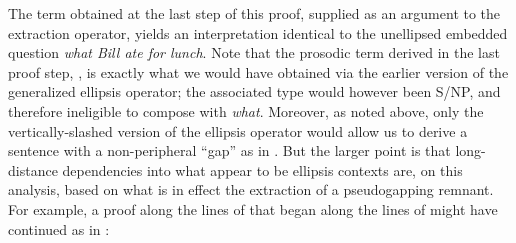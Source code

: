 \documentclass[output=paper,colorlinks,citecolor=brown]{langscibook}
\begin{document}
\begin{exe}
 \ex\label{extractionVPE-drv-part2}
\end{exe}

\noindent The term obtained at the last step of this proof, supplied as an
argument to the extraction operator, yields an interpretation
identical to the unellipsed embedded question \textit{what Bill ate for
lunch}. Note that the prosodic term derived in the last proof step,
, is exactly what we would have obtained via
the earlier version of the generalized ellipsis operator; the
associated type would however been S/NP, and therefore ineligible to
compose with \textit{what}. Moreover, as noted above, only the
vertically-slashed version of the ellipsis operator would allow us to
derive a sentence with a non-peripheral ``gap'' as in .
But the larger point is that long-distance dependencies into what
appear to be ellipsis contexts are, on this analysis, based on what is
in effect the extraction of a pseudogapping remnant. For example,
a proof along the lines of that began along the lines of
 might have continued as in :
\end{document}
